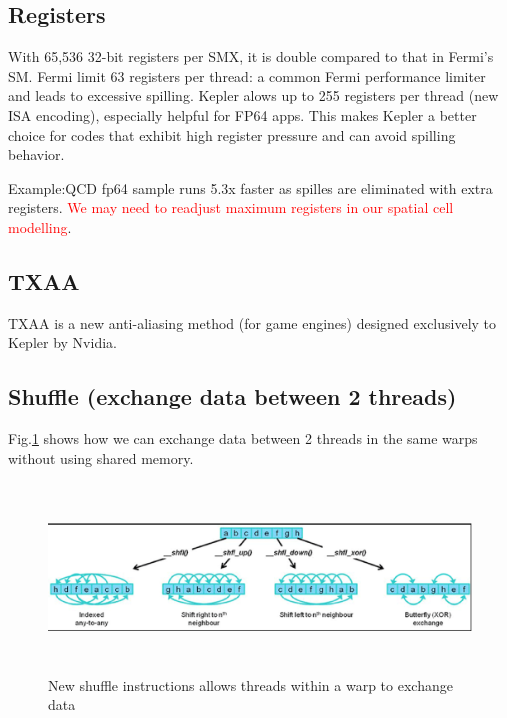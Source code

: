 \subsection{Registers}
\label{sec:Kepler_registers}

With 65,536 32-bit registers per SMX, it is double compared to that in Fermi's
SM. Fermi limit 63 registers per thread: a common Fermi performance limiter and
leads to excessive spilling. Kepler alows up to 255 registers per thread (new
ISA encoding), especially helpful for FP64 apps. This makes Kepler a better
choice for codes that exhibit high register pressure and can avoid spilling
behavior.

Example:QCD fp64 sample runs 5.3x faster as spilles are eliminated with extra
registers. \textcolor{red}{We may need to readjust maximum registers in our
spatial cell modelling}.


\subsection{TXAA} 

TXAA is a new anti-aliasing method (for game engines) designed exclusively to
Kepler by Nvidia.

\subsection{Shuffle (exchange data between 2 threads)}

Fig.\ref{fig:Kepler_shuffle} shows how we can exchange data between 2 threads in
the same warps without using shared memory.


 \begin{figure}[hbt]
  \centerline{\includegraphics[height=5cm,
    angle=0]{./images/Kepler_shuffle.eps}}
  \caption{New shuffle instructions allows threads within a warp to exchange
  data}
  \label{fig:Kepler_shuffle}
\end{figure}


